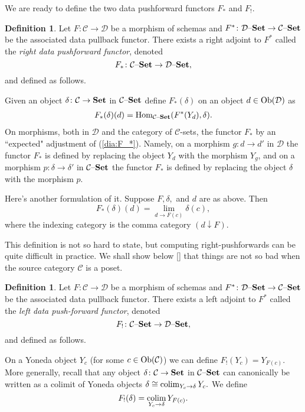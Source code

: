 \documentclass{amsart}
\def\tn{\textnormal}
\def\mc{\mathcal}
\def\Hom{\tn{Hom}}
\def\Ob{\tn{Ob}}
\def\to{\rightarrow}
\def\taking{\colon}
\def\iso{\cong}
\def\down{\downarrow}
\def\Set{{\bf Set}}
\def\set{{\text \textendash}{\bf Set}}
\def\colim{\mathop{\tn{colim}}}
\def\mcC{\mc{C}}
\def\mcD{\mc{D}}
\theoremstyle{remark}
\theoremstyle{definition}
\newtheorem{definition}[theorem]{Definition}
\begin{document}
We are ready to define the two data pushforward functors $F_*$ and $F_!$.

\begin{definition}

Let $F\taking\mcC\to\mcD$ be a morphism of schemas and $F^*\taking\mcD\set\to\mcC\set$ be the associated data pullback functor.  There exists a right adjoint to $F^*$ called the {\em right data pushforward functor}, denoted $$F_*\taking\mcC\set\to\mcD\set,$$ and defined as follows.
 
Given an object $\delta\taking\mcC\to\Set$ in $\mcC\set$ define $F_*(\delta)$ on an object $d\in\Ob(\mcD)$ as \begin{align}\label{dia:F_*}F_*(\delta)(d)=\Hom_{\mcC\set}(F^*(Y_d),\delta).\end{align}  On morphisms, both in $\mcD$ and the category of $\mcC$-sets, the functor $F_*$ by an ``expected" adjustment of (\ref{dia:F_*}).  Namely, on a morphism $g\taking d\to d'$ in $\mcD$ the functor $F_*$ is defined by replacing the object $Y_d$ with the morphism $Y_g$, and on a morphism $p\taking\delta\to\delta'$ in $\mcC\set$ the functor $F_*$ is defined by replacing the object $\delta$ with the morphism $p$.

\end{definition}

Here's another formulation of it.  Suppose $F,\delta,$ and $d$ are as above.  Then $$F_*(\delta)(d)=\lim_{d\to F(c)}\delta(c),$$ where the indexing category is the comma category $(d\down F)$.

This definition is not so hard to state, but computing right-pushforwards can be quite difficult in practice.  We shall show below \ref{} that things are not so bad when the source category $\mcC$ is a poset.

\begin{definition}

Let $F\taking\mcC\to\mcD$ be a morphism of schemas and $F^*\taking\mcD\set\to\mcC\set$ be the associated data pullback functor.  There exists a left adjoint to $F^*$ called the {\em left data push-forward functor}, denoted $$F_!\taking\mcC\set\to\mcD\set,$$ and defined as follows.

On a Yoneda object $Y_c$ (for some $c\in\Ob(\mcC)$) we can define $F_!(Y_c)=Y_{F(c)}$.  More generally,  recall that any object $\delta\taking\mcC\to\Set$ in $\mcC\set$ can canonically be written as a colimit of Yoneda objects $\delta\iso\colim_{Y_c\to\delta}Y_c.$   We define $$F_!(\delta)=\colim_{Y_c\to\delta}Y_{F(c)}.$$  

\end{definition}
\end{document}
